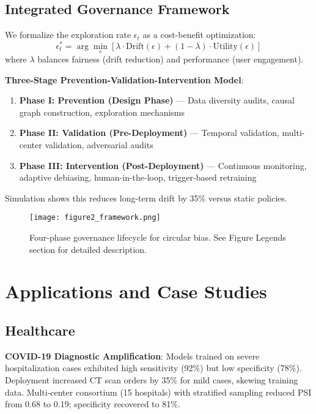 \documentclass[11pt]{article}
\begin{document}
\subsection{Integrated Governance Framework}

We formalize the exploration rate $\epsilon_t$ as a cost-benefit optimization:
\begin{equation}
\epsilon_t^* = \arg\min_{\epsilon} \left[ \lambda \cdot \text{Drift}(\epsilon) + (1-\lambda) \cdot \text{Utility}(\epsilon) \right]
\end{equation}
where $\lambda$ balances fairness (drift reduction) and performance (user engagement).

\textbf{Three-Stage Prevention-Validation-Intervention Model}:
\begin{enumerate}
    \item \textbf{Phase I: Prevention (Design Phase)} — Data diversity audits, causal graph construction, exploration mechanisms
    \item \textbf{Phase II: Validation (Pre-Deployment)} — Temporal validation, multi-center validation, adversarial audits
    \item \textbf{Phase III: Intervention (Post-Deployment)} — Continuous monitoring, adaptive debiasing, human-in-the-loop, trigger-based retraining
\end{enumerate}

Simulation shows this reduces long-term drift by 35\% versus static policies.

\begin{figure}[H]
\centering
\texttt{[image: figure2\_framework.png]}
\caption{Four-phase governance lifecycle for circular bias. See Figure Legends section for detailed description.}
\label{fig:framework}
\end{figure}

\section{Applications and Case Studies}

\subsection{Healthcare}

\textbf{COVID-19 Diagnostic Amplification}: Models trained on severe hospitalization cases exhibited high sensitivity (92\%) but low specificity (78\%). Deployment increased CT scan orders by 35\% for mild cases, skewing training data. Multi-center consortium (15 hospitals) with stratified sampling reduced PSI from 0.68 to 0.19; specificity recovered to 81\%\cite{varoquaux2022}.
\end{document}
